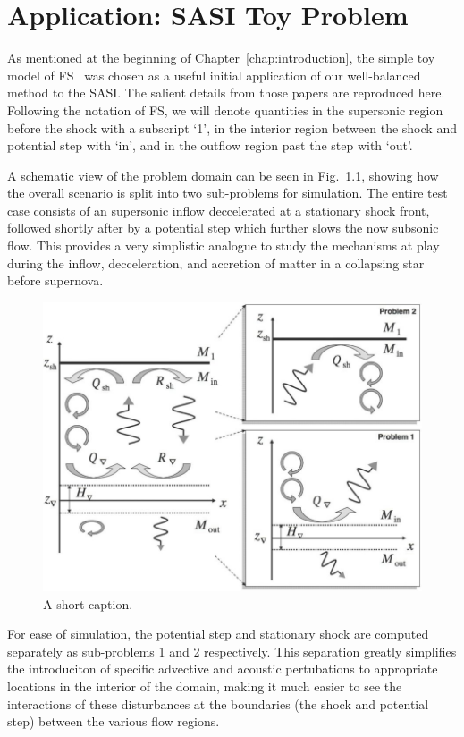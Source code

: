 \chapter{Application: SASI Toy Problem}
\label{chap:application}

As mentioned at the beginning of Chapter~\ref{chap:introduction}, the simple toy model of FS~\cite{Foglizzo2009,Sato2009} was chosen as a useful initial application of our well-balanced method to the SASI. The salient details from those papers  are reproduced here. Following the notation of FS, we will denote quantities in the supersonic region before the shock with a subscript `1', in the interior region between the shock and potential step with `in', and in the outflow region past the step with `out'.

A schematic view of the problem domain can be seen in Fig.~\ref{fig:Sato1}, showing how the overall scenario is split into two sub-problems for simulation. The entire test case consists of an supersonic inflow deccelerated at a stationary shock front, followed shortly after by a potential step which further slows the now subsonic flow. This provides a very simplistic analogue to study the mechanisms at play during the inflow, decceleration, and accretion of matter in a collapsing star before supernova.

\begin {figure}
\centering
\includegraphics[width=13cm]{figures/Sato1}
\caption {A short caption.}
\label{fig:Sato1}
\end{figure}

For ease of simulation, the potential step and stationary shock are computed separately as sub-problems 1 and 2 respectively. This separation greatly simplifies the introduciton of specific advective and acoustic pertubations to appropriate locations in the interior of the domain, making it much easier to see the interactions of these disturbances at the boundaries (the shock and potential step) between the various flow regions.


